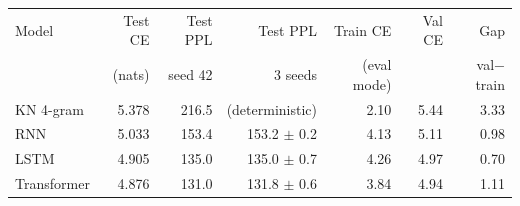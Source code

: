 \begin{tabular}{lrrrrrr}
\toprule
Model & Test CE & Test PPL & Test PPL & Train CE & Val CE & Gap \\
 & (nats) & seed 42 & 3 seeds & (eval mode) & & val$-$train \\
\midrule
KN 4-gram & 5.378 & 216.5 & (deterministic) & 2.10 & 5.44 & 3.33 \\
RNN & 5.033 & 153.4 & 153.2 $\pm$ 0.2 & 4.13 & 5.11 & 0.98 \\
LSTM & 4.905 & 135.0 & 135.0 $\pm$ 0.7 & 4.26 & 4.97 & 0.70 \\
Transformer & 4.876 & 131.0 & 131.8 $\pm$ 0.6 & 3.84 & 4.94 & 1.11 \\
\bottomrule
\end{tabular}
